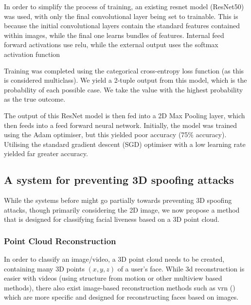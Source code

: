 \documentclass[10pt,a4paper]{article}
\begin{document}
        In order to simplify the process of training, an existing resnet model (ResNet50) was used, with only the final convolutional layer being
        set to trainable. This is because the initial convolutional layers contain the standard features contained within images, while the final one
        learns bundles of features. Internal feed forward activations use relu, while the external output uses the softmax activation function

        Training was completed using the categorical cross-entropy loss function (as this is considered multiclass).
        We yield a 2-tuple output from this model, which is the probability of each possible case. We take the value with the highest probability as the true outcome.

        The output of this ResNet model is then fed into a 2D Max Pooling layer, which then feeds into a feed forward neural network.
        Initially, the model was trained using the Adam optimiser, but this yielded poor accuracy (75\% accuracy). Utilising the standard
        gradient descent (SGD) optimiser with a low learning rate yielded far greater accuracy.


    \subsection{A system for preventing 3D spoofing attacks}
        While the systems before might go partially towards preventing 3D spoofing attacks, though primarily considering the 2D image, we now propose a method
        that is designed for classifying facial liveness based on a 3D point cloud.

        \subsubsection{Point Cloud Reconstruction}
            In order to classify an image/video, a 3D point cloud needs to be created, containing many 3D points $(x,y,z)$
            of a user's face. While 3d reconstruction is easier with videos (using structure from motion or other multiview based methods),
            there also exist image-based reconstruction methods such as vrn (\citealt{3DReconstructionMethod}) which are more specific and designed for reconstructing faces based on images.
\end{document}
